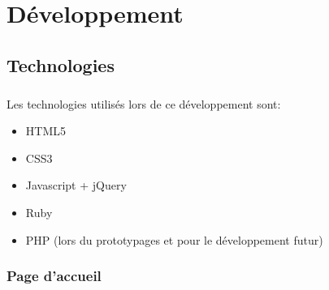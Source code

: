 \documentclass[11pt,a4paper]{report}
\begin{document}
\chapter{Développement}
	\section{Technologies}
		\paragraph*{}Les technologies utilisés lors de ce développement sont:
			\begin{itemize}
				\item HTML5
				\item CSS3
				\item Javascript + jQuery
				\item Ruby
				\item PHP (lors du prototypages et pour le développement futur)
			\end{itemize}
		\subsection{Page d'accueil}
\end{document}
